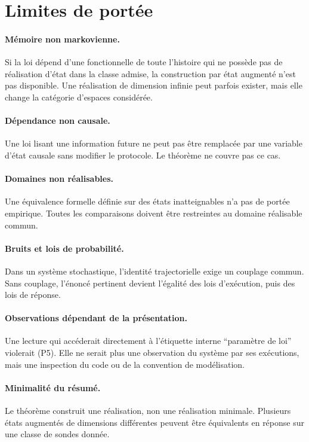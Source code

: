 \section{Limites de portée}
\label{annexe-K-limites}

\paragraph{Mémoire non markovienne.}
Si la loi dépend d'une fonctionnelle de toute l'histoire qui ne possède
pas de réalisation d'état dans la classe admise, la construction par
état augmenté n'est pas disponible. Une réalisation de dimension infinie
peut parfois exister, mais elle change la catégorie d'espaces considérée.

\paragraph{Dépendance non causale.}
Une loi lisant une information future ne peut pas être remplacée par une
variable d'état causale sans modifier le protocole. Le théorème ne couvre
pas ce cas.

\paragraph{Domaines non réalisables.}
Une équivalence formelle définie sur des états inatteignables n'a pas de
portée empirique. Toutes les comparaisons doivent être restreintes au
domaine réalisable commun.

\paragraph{Bruits et lois de probabilité.}
Dans un système stochastique, l'identité trajectorielle exige un couplage
commun. Sans couplage, l'énoncé pertinent devient l'égalité des lois
d'exécution, puis des lois de réponse.

\paragraph{Observations dépendant de la présentation.}
Une lecture qui accéderait directement à l'étiquette interne ``paramètre
de loi'' violerait (P5). Elle ne serait plus une observation du système
par ses exécutions, mais une inspection du code ou de la convention de
modélisation.

\paragraph{Minimalité du résumé.}
Le théorème construit une réalisation, non une réalisation minimale. Plusieurs états augmentés de dimensions différentes peuvent être équivalents en réponse sur une classe de sondes donnée.

